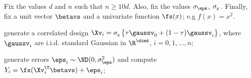 Fix the values \( d \) and \( n \) such that \( n \geq 10 d \).
Also, fix the values \( \sigma_{\eps} \), \( \sigma_{\!_{X}} \).
Finally, fix a unit vector \( \betavs \) and a univariate function \( \fs(x) \); e.g \( f(x) = x^{2} \).
\begin{mylist}

\item 
generate a correlated design \( \Xv_{i} = \sigmaX \bigl\{ \corr \gaussv_{0} + (1 - \corr) \gaussv_{i} \bigr\} \),
where \( \gaussv_{i} \) are i.i.d. standard Gaussian in \( \R^{\dimd} \), \( i=0,1,\ldots,n \);
\item 
generate errors \( \eps_{i} \sim \ND(0,\sigma_{\eps}^{2}) \) and compute \( Y_{i} = \fs(\Xv_{i}^{\T} \betavs) + \eps_{i} \);

\end{mylist}

